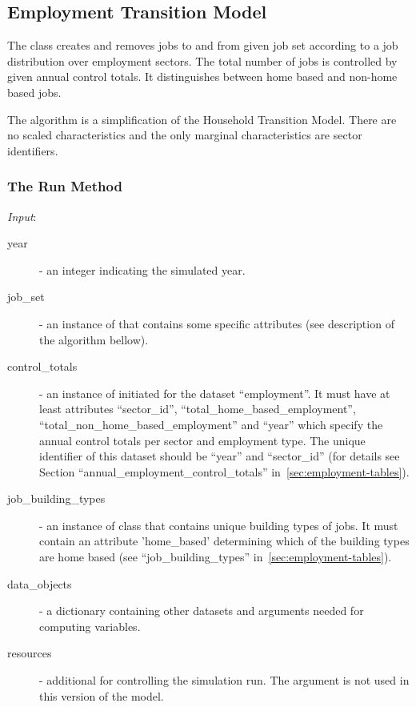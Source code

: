%
\subsection{Employment Transition Model}
\modelsindex
%
\label{sec:employment-transition-model}

The class  \modelsindex creates and removes jobs to and
from given job set according to a job distribution over employment sectors.
The total number of jobs is controlled by given annual control totals. It
distinguishes between home based and non-home based jobs.

The algorithm is a simplification of the Household Transition Model. \modelsindex There are
no scaled characteristics and the only marginal characteristics are sector
identifiers.

\subsubsection{The Run Method}
%
{\it Input}:
\begin{description}
\item[year] - an integer indicating the simulated year.
\item[job_set] - an instance of  \datasetindex that contains some
  specific attributes \attributesindex (see description of the algorithm bellow).
\item[control_totals] - an instance of  initiated for
  the dataset ``employment''. It must have at least attributes \attributesindex ``sector_id'',
  ``total_home_based_employment'', ``total_non_home_based_employment'' and
  ``year'' which specify the annual control totals per sector and employment
  type.  The unique identifier of this dataset \datasetindex should be ``year'' and
  ``sector_id'' (for details see Section ``annual_employment_control_totals''
  in~\ref{sec:employment-tables}).
\item[job_building_types] - an instance of class  that contains unique 
building types of jobs. It must contain an attribute 'home_based' determining which 
of the building types are home based (see ``job_building_types'' in~\ref{sec:employment-tables}).
 \item[data_objects] - a dictionary containing other datasets \datasetindex and arguments
  needed for computing variables. \variablesindex
\item[resources] - additional  for controlling the
  simulation run. The argument is not used in this version of the model. \modelsindex
\end{description}


